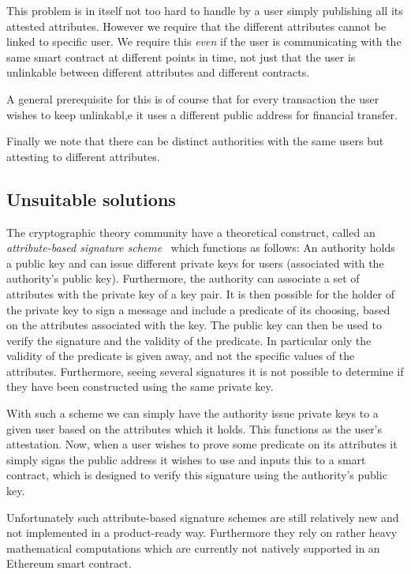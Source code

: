 \documentclass[11pt]{article} %
\begin{document}
This problem is in itself not too hard to handle by a user simply publishing all its attested attributes. However we require that the different attributes cannot be linked to specific user. We require this \emph{even} if the user is communicating with the same smart contract at different points in time, not just that the user is unlinkable between different attributes and different contracts.

A general prerequisite for this is of course that for every transaction the user wishes to keep unlinkabl,e it uses a different public address for financial transfer. 

Finally we note that there can be distinct authorities with the same users but attesting to different attributes.

\subsection{Unsuitable solutions}
The cryptographic theory community have a theoretical construct, called an \emph{attribute-based signature scheme}~\cite{MPR11} which functions as follows: An authority holds a public key and can issue different private keys for users (associated with the authority's public key). Furthermore, the authority can associate a set of attributes with the private key of a key pair. It is then possible for the holder of the private key to sign a message and include a predicate of its choosing, based on the attributes associated with the key. The public key can then be used to verify the signature and the validity of the predicate. In particular only the validity of the predicate is given away, and not the specific values of the attributes. Furthermore, seeing several signatures it is not possible to determine if they have been constructed using the same private key. 

With such a scheme we can simply have the authority issue private keys to a given user based on the attributes which it holds. This functions as the user's attestation. Now, when a user wishes to prove some predicate on its attributes it simply signs the public address it wishes to use and inputs this to a smart contract, which is designed to verify this signature using the authority's public key.

Unfortunately such attribute-based signature schemes are still relatively new and not implemented in a product-ready way. Furthermore they rely on rather heavy mathematical computations which are currently not natively supported in an Ethereum smart contract.
\end{document}
